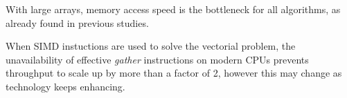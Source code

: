 \documentclass[preprint,1p,times]{elsarticle}
\begin{document}
With large arrays, memory access speed is the bottleneck for all algorithms, as already found in previous studies.

When SIMD instuctions are used to solve the vectorial problem, the unavailability of effective \textit{gather} instructions on modern CPUs prevents throughput to scale up by more than a factor of 2, however this may change as technology keeps enhancing. 


\end{document}
